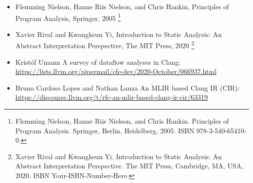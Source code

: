 
\begin{itemize}
\item
Flemming Nielson, Hanne Riis Nielson, and Chris Hankin, Principles of Program Analysis, Springer, 2005 \footnote{Flemming Nielson, Hanne Riis Nielson, and Chris Hankin. Principles of Program Analysis. Springer, Berlin, Heidelberg, 2005. ISBN 978-3-540-65410-0.}

\item
Xavier Rival and Kwangkeun Yi, Introduction to Static Analysis: An Abstract Interpretation Perspective, The MIT Press, 2020 \footnote{Xavier Rival and Kwangkeun Yi. Introduction to Static Analysis: An Abstract Interpretation Perspective. The MIT Press, Cambridge, MA, USA, 2020. ISBN Your-ISBN-Number-Here.}

\item
Kristóf Umann A survey of dataflow analyses in Clang: \url{https://lists.llvm.org/pipermail/cfe-dev/2020-October/066937.html}

\item
Bruno Cardoso Lopes and Nathan Lanza An MLIR based Clang IR (CIR): \url{https://discourse.llvm.org/t/rfc-an-mlir-based-clang-ir-cir/63319}
\end{itemize}